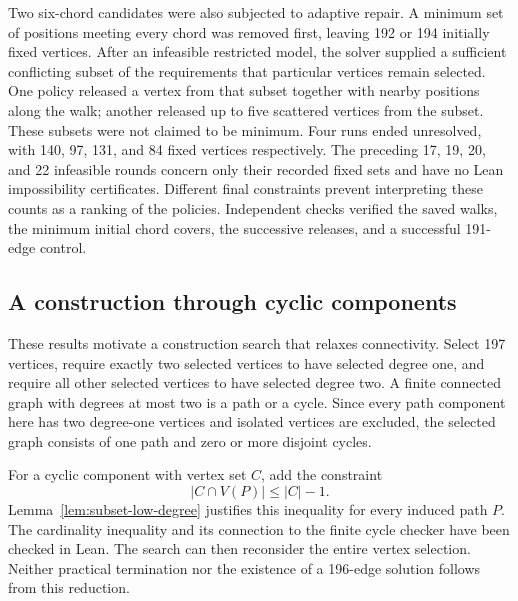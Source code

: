 \documentclass[11pt,a4paper]{article}
\theoremstyle{definition}
\theoremstyle{remark}
\begin{document}
Two six-chord candidates were also subjected to adaptive repair. A minimum set of positions meeting every chord was removed first, leaving 192 or 194 initially fixed vertices. After an infeasible restricted model, the solver supplied a sufficient conflicting subset of the requirements that particular vertices remain selected. One policy released a vertex from that subset together with nearby positions along the walk; another released up to five scattered vertices from the subset. These subsets were not claimed to be minimum. Four runs ended unresolved, with 140, 97, 131, and 84 fixed vertices respectively. The preceding 17, 19, 20, and 22 infeasible rounds concern only their recorded fixed sets and have no Lean impossibility certificates. Different final constraints prevent interpreting these counts as a ranking of the policies. Independent checks verified the saved walks, the minimum initial chord covers, the successive releases, and a successful 191-edge control.

\subsection{A construction through cyclic components}
These results motivate a construction search that relaxes connectivity. Select 197 vertices, require exactly two selected vertices to have selected degree one, and require all other selected vertices to have selected degree two. A finite connected graph with degrees at most two is a path or a cycle. Since every path component here has two degree-one vertices and isolated vertices are excluded, the selected graph consists of one path and zero or more disjoint cycles.

For a cyclic component with vertex set $C$, add the constraint
\[
|C\cap V(P)|\le |C|-1.
\]
Lemma~\ref{lem:subset-low-degree} justifies this inequality for every induced path $P$. The cardinality inequality and its connection to the finite cycle checker have been checked in Lean. The search can then reconsider the entire vertex selection. Neither practical termination nor the existence of a 196-edge solution follows from this reduction.
\end{document}
